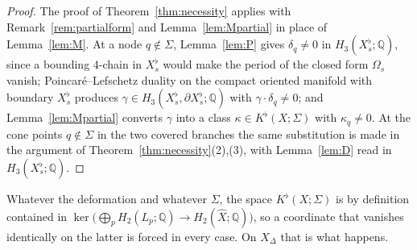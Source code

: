 \documentclass[11pt]{amsart}
\theoremstyle{definition}
\theoremstyle{remark}
\theoremstyle{plain}
\newcommand{\QQ}{\mathbb{Q}}
\newcommand{\Xh}{\widehat{X}}
\begin{document}
\begin{proof}
The proof of Theorem~\ref{thm:necessity} applies with
Remark~\ref{rem:partialform} and Lemma~\ref{lem:Mpartial} in place of
Lemma~\ref{lem:M}.  At a node $q\notin\Sigma$, Lemma~\ref{lem:P}
gives $\delta_q\neq0$ in $H_3(X_s^{\flat};\QQ)$, since a bounding
$4$-chain in $X_s^{\flat}$ would make the period of the closed form
$\Omega_s$ vanish; Poincar\'e--Lefschetz duality on the compact
oriented manifold with boundary $X_s^{\flat}$ produces
$\gamma\in H_3(X_s^{\flat},\partial X_s^{\flat};\QQ)$ with
$\gamma\cdot\delta_q\neq0$; and Lemma~\ref{lem:Mpartial} converts
$\gamma$ into a class $\kappa\in K^{\flat}(X;\Sigma)$ with
$\kappa_q\neq0$.  At the cone points $q\notin\Sigma$ in the two
covered branches the same substitution is made in the argument of
Theorem~\ref{thm:necessity}(2),(3), with Lemma~\ref{lem:D} read in
$H_3(X_s^{\flat};\QQ)$.
\end{proof}

Whatever the deformation and whatever $\Sigma$, the space
$K^{\flat}(X;\Sigma)$ is by definition contained in
$\ker\bigl(\bigoplus_pH_2(L_p;\QQ)\to H_2(\Xh;\QQ)\bigr)$, so a
coordinate that vanishes identically on the latter is forced in every
case.  On $X_{\Delta}$ that is what happens.
\end{document}

